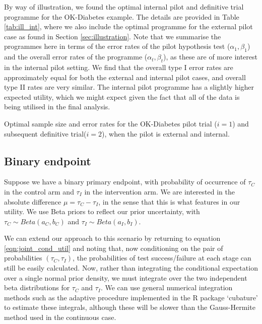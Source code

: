 \documentclass[sagev, Crown]{sagej} %
\begin{document}
By way of illustration, we found the optimal internal pilot and definitive trial programme for the OK-Diabetes example. The details are provided in Table \ref{tab:ill_int}, where we also include the optimal programme for the external pilot case as found in Section \ref{sec:illustration}. Note that we summarise the programmes here in terms of the error rates of the pilot hypothesis test ($\alpha_1, \beta_1$) and the overall error rates of the programme ($\alpha_t, \beta_t$), as these are of more interest in the internal pilot setting. We find that the overall type I error rates are approximately equal for both the  external and internal pilot cases, and overall type II rates are very similar. The internal pilot programme has a slightly higher expected utility, which we might expect given the fact that all of the data is being utilised in the final analysis.

\begin{table}
\small\sf\centering
\caption{Optimal sample size and error rates for the OK-Diabetes pilot trial ($i = 1$) and subsequent definitive trial($i = 2$), when the pilot is external and internal.}

\label{tab:ill_int}
\end{table}



\subsection{Binary endpoint}

Suppose we have a binary primary endpoint, with probability of occurrence of $\tau_C$ in the control arm and $\tau_I$ in the intervention arm. We are interested in the absolute difference $\mu = \tau_C - \tau_I$, in the sense that this is what features in our utility. We use Beta priors to reflect our prior uncertainty, with $\tau_C \sim Beta(a_C, b_C)$ and $\tau_I \sim Beta(a_I, b_I)$.

We can extend our approach to this scenario by returning to equation \ref{eqn:joint_cond_util} and noting that, now conditioning on the pair of probabilities $(\tau_C, \tau_I)$, the probabilities of test success/failure at each stage can still be easily calculated. Now, rather than integrating the conditional expectation over a single normal prior density, we must integrate over the two independent beta distributions for $\tau_C$ and $\tau_I$. We can use general numerical integration methods such as the adaptive procedure implemented in the R package `cubature' \cite{Narasimhan2018} to estimate these integrals, although these will be slower than the Gauss-Hermite method used in the continuous case.
\end{document}
